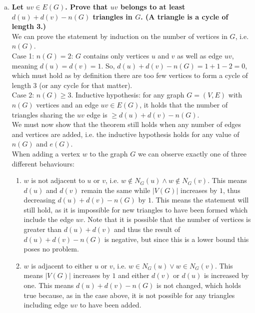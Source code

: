 \begin{enumerate}[a)]
    \linebreak 
    \boldmath
    \item \textbf{Let $uv \in E(G)$. Prove that $uv$ belongs to at least $d(u)+d(v)-n(G)$ triangles in $G$. (A triangle is a cycle of length 3.)} 
    \unboldmath
    \\
    \linebreak 
    We can prove the statement by induction on the number of vertices in $G$, i.e. $n(G)$. \\
    \linebreak 
    Case 1: $n(G) = 2$: $G$ contains only vertices $u$ and $v$ as well as edge $uv$, meaning $d(u) = d(v) = 1$. So, $d(u)+d(v)-n(G) = 1 + 1 - 2 = 0$, which must hold as by definition there are too few vertices to form a cycle of length 3 (or any cycle for that matter). \\
    \linebreak 
    Case 2: $n(G) \geq 3$. Inductive hypothesis: for any graph $G = (V,E)$ with $n(G)$ vertices and an edge $uv \in E(G)$, it holds that the number of triangles sharing the $uv$ edge is $ \geq d(u)+d(v)-n(G)$. \\
    \linebreak
    We must now show that the theorem still holds when any number of edges and vertices are added, i.e. the inductive hypothesis holds for any value of $n(G)$ and $e(G)$. \\
    \linebreak 
    When adding a vertex $w$ to the graph $G$ we can observe exactly one of three different behaviours:
    \begin{enumerate}
        \item $w$ is not adjacent to $u$ or $v$, i.e. $w \notin N_G(u) \wedge w \notin N_G(v)$. This means $d(u)$ and $d(v)$ remain the same while $|V(G)|$ increases by $1$, thus decreasing $d(u)+d(v)-n(G)$ by $1$. This means the statement will still hold, as it is impossible for new triangles to have been formed which include the edge $uv$. Note that it is possible that the number of vertices is greater than $d(u)+d(v)$ and thus the result of $d(u)+d(v)-n(G)$ is negative, but since this is a lower bound this poses no problem. 
        \item $w$ is adjacent to either $u$ or $v$, i.e. $w \in N_G(u) \vee w \in N_G(v)$. This means $|V(G)|$ increases by $1$ and either $d(v)$ or $d(u)$ is increased by one. This means $ d(u)+d(v)-n(G)$ is not changed, which holds true because, as in the case above, it is not possible for any triangles including edge $uv$ to have been added. 

\end{enumerate}
\end{enumerate}
